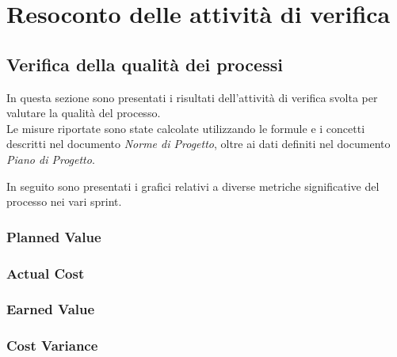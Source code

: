 \section{Resoconto delle attività di verifica}

\subsection{Verifica della qualità dei processi}
In questa sezione sono presentati i risultati dell'attività di verifica svolta per valutare la qualità del processo.\\
Le misure riportate sono state calcolate utilizzando le formule e i concetti descritti nel documento \textit{Norme di Progetto}, oltre ai dati definiti nel documento \textit{Piano di Progetto}.

% 

In seguito sono presentati i grafici relativi a diverse metriche significative del processo nei vari sprint.

\subsubsection{Planned Value}

\subsubsection{Actual Cost}

\subsubsection{Earned Value}

\subsubsection{Cost Variance}

